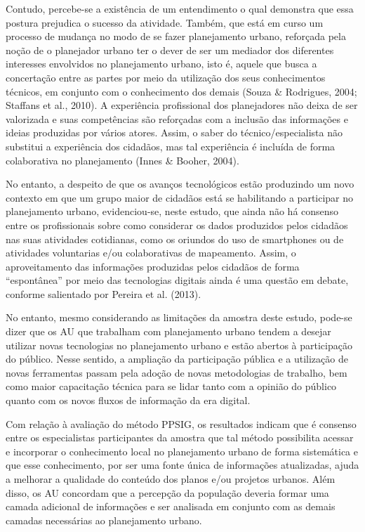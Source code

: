 \documentclass{article}
\begin{document}
\begin{multicols}{2}
Contudo, percebe-se a existência de um entendimento o qual demonstra que essa
postura
prejudica o sucesso da atividade. Também, que está em curso um processo de
mudança
no modo de se fazer planejamento urbano, reforçada pela noção de o planejador
urbano
ter o dever de ser um mediador dos diferentes interesses envolvidos no
planejamento
urbano, isto é, aquele que busca a concertação entre as partes por meio da
utilização dos seus conhecimentos técnicos, em conjunto com o conhecimento dos
demais (Souza \& Rodrigues, 2004; Staffans et al., 2010). A experiência
profissional dos planejadores não deixa de ser valorizada e suas competências
são
reforçadas com a inclusão das informações e ideias produzidas por vários atores.
Assim, o saber do técnico/especialista não substitui a experiência dos cidadãos,
mas
tal experiência é incluída de forma colaborativa no planejamento (Innes \&
Booher, 2004).

No entanto, a despeito de que os avanços tecnológicos estão produzindo um novo
contexto em que um grupo maior de cidadãos está se habilitando a participar no
planejamento urbano, evidenciou-se, neste estudo, que ainda não há consenso
entre os
profissionais sobre como considerar os dados produzidos pelos cidadãos nas suas
atividades cotidianas, como os oriundos do uso de smartphones ou de
atividades voluntarias e/ou colaborativas de mapeamento. Assim, o aproveitamento
das
informações produzidas pelos cidadãos de forma “espontânea” por meio das
tecnologias
digitais ainda é uma questão em debate, conforme salientado por Pereira et al.
(2013).

No entanto, mesmo considerando as limitações da amostra deste estudo, pode-se
dizer
que os AU que trabalham com planejamento urbano tendem a desejar utilizar novas
tecnologias no planejamento urbano e estão abertos à participação do público.
Nesse
sentido, a ampliação da participação pública e a utilização de novas ferramentas
passam pela adoção de novas metodologias de trabalho, bem como maior capacitação
técnica para se lidar tanto com a opinião do público quanto com os novos fluxos
de
informação da era digital.

Com relação à avaliação do método PPSIG, os resultados indicam que é consenso
entre
os especialistas participantes da amostra que tal método possibilita acessar e
incorporar o conhecimento local no planejamento urbano de forma sistemática e
que
esse conhecimento, por ser uma fonte única de informações atualizadas, ajuda a
melhorar a qualidade do conteúdo dos planos e/ou projetos urbanos. Além disso,
os AU
concordam que a percepção da população deveria formar uma camada adicional de
informações e ser analisada em conjunto com as demais camadas necessárias ao
planejamento urbano.


\end{multicols}
\end{document}
